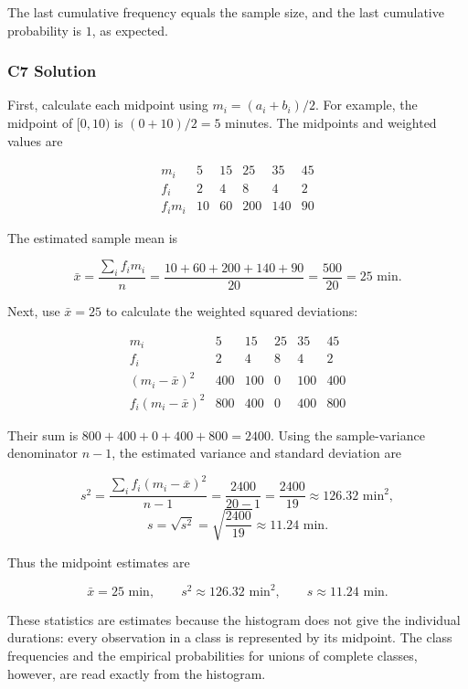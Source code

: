 The last cumulative frequency equals the sample size, and the last
cumulative probability is $1$, as expected.


\subsubsection*{C7 Solution}
\label{subsec:c7-histogram-solution}

First, calculate each midpoint using $m_i=(a_i+b_i)/2$. For example,
the midpoint of $[0,10)$ is $(0+10)/2=5$ minutes. The midpoints and
weighted values are

\[
\begin{array}{c|ccccc}
    m_i & 5 & 15 & 25 & 35 & 45 \\ \hline
    f_i & 2 & 4 & 8 & 4 & 2 \\
    f_i m_i & 10 & 60 & 200 & 140 & 90
\end{array}
\]

The estimated sample mean is

\[
\bar{x}=\frac{\sum_i f_i m_i}{n}
=\frac{10+60+200+140+90}{20}
=\frac{500}{20}=25\text{ min}.
\]

Next, use $\bar{x}=25$ to calculate the weighted squared deviations:

\[
\begin{array}{c|ccccc}
    m_i & 5 & 15 & 25 & 35 & 45 \\ \hline
    f_i & 2 & 4 & 8 & 4 & 2 \\
    (m_i-\bar{x})^2 & 400 & 100 & 0 & 100 & 400 \\
    f_i(m_i-\bar{x})^2 & 800 & 400 & 0 & 400 & 800
\end{array}
\]

Their sum is $800+400+0+400+800=2400$. Using the sample-variance
denominator $n-1$, the estimated variance and standard deviation are

\[
s^2=\frac{\sum_i f_i(m_i-\bar{x})^2}{n-1}
=\frac{2400}{20-1}=\frac{2400}{19}
\approx126.32\text{ min}^2,
\]
\[
s=\sqrt{s^2}=\sqrt{\frac{2400}{19}}\approx11.24\text{ min}.
\]

Thus the midpoint estimates are

\[
\boxed{\bar{x}=25\text{ min},\qquad
s^2\approx126.32\text{ min}^2,\qquad s\approx11.24\text{ min}.}
\]

These statistics are estimates because the histogram does not give the
individual durations: every observation in a class is represented by its
midpoint. The class frequencies and the empirical probabilities for unions
of complete classes, however, are read exactly from the histogram.



